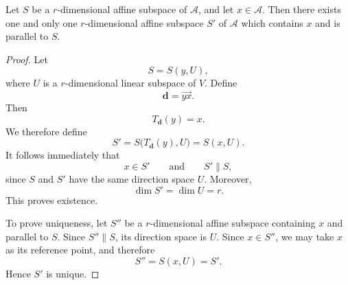 \documentclass[12pt]{article}
\begin{document}
\begin{proposition}
Let \(S\) be a \(r\)-dimensional affine subspace of \(\mathcal A\), and let
\(x\in \mathcal A\). Then there exists one and only one \(r\)-dimensional
affine subspace \(S'\) of \(\mathcal A\) which contains \(x\) and is parallel
to \(S\).
\end{proposition}

\begin{proof}
Let
\[
S=S(y,U),
\]
where \(U\) is a \(r\)-dimensional linear subspace of \(V\). Define
\[
\mathbf d=\overrightarrow{yx}.
\]
Then
\[
T_{\mathbf d}(y)=x.
\]
We therefore define
\[
S'
   =S\bigl(T_{\mathbf d}(y),U\bigr)
   =S(x,U).
\]
It follows immediately that
\[
x\in S'
\qquad\text{and}\qquad
S'\parallel S,
\]
since \(S\) and \(S'\) have the same direction space \(U\). Moreover,
\[
\dim S'=\dim U=r.
\]
This proves existence.

To prove uniqueness, let \(S''\) be a \(r\)-dimensional affine
subspace containing \(x\) and parallel to \(S\). Since \(S''\parallel
S\), its direction space is \(U\). Since \(x\in S''\), we may take
\(x\) as its reference point, and therefore
\[
S''=S(x,U)=S'.
\]
Hence \(S'\) is unique.
\end{proof}
\end{document}
